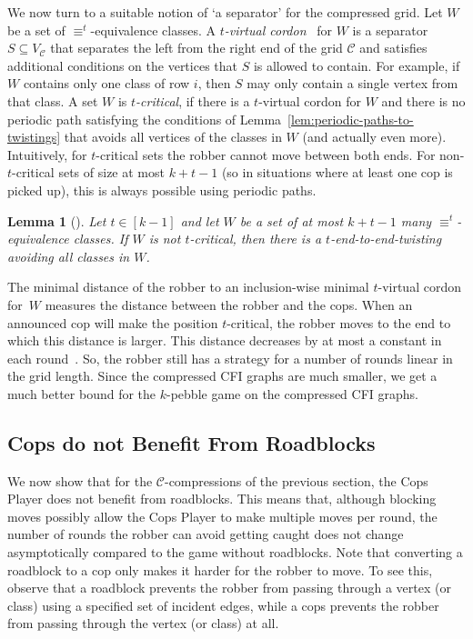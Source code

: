 \documentclass[10pt,a4paper]{article}
\newcommand{\defining}[1]{\emph{#1}}
\newcommand{\comp}{\equiv}
\newcommand{\grid}{\mathcal{C}}
\newcommand{\vertexC}{V_{\mathcal{C}}}
\newtheorem{lemma}[theorem]{Lemma}
\begin{document}
\noindent We now turn to a suitable notion of `a separator' for the compressed grid.
Let $W$ be a set of $\comp^t$-equivalence classes.
A \defining{$t$-virtual cordon}~\cite{RFJN024} for $W$
is a separator $S \subseteq \vertexC$ that separates the left from the right end of the grid $\grid$ and satisfies additional conditions on the vertices that $S$ is allowed to contain. For example, if $W$ contains only one class of row $i$, then $S$ may only contain a single vertex from that class.
A set $W$ is \defining{$t$-critical}, if there is a $t$-virtual cordon for $W$
and there is no periodic path satisfying the conditions of Lemma~\ref{lem:periodic-paths-to-twistings} that avoids all vertices of the classes in $W$ (and actually even more).
Intuitively, for $t$-critical sets the robber cannot move between both ends. For non-$t$-critical sets of size at most $k+t-1$ (so in situations where at least one cop is picked up), this is always possible using periodic paths.
\begin{lemma}[\cite{RFJN024}]
        \label{lem:compressed-non-blocking-strategy}
        Let $t \in [k-1]$ and let $W$ be a set of at most $k+t-1$ many $\comp^t$-equivalence classes. 
        If $W$ is not $t$-critical,
        then there is a $t$-end-to-end-twisting avoiding all classes in $W$.
\end{lemma}
The minimal distance of the robber
to an inclusion-wise minimal $t$-virtual cordon for~$W$ measures the distance between the robber and the cops.
When an announced cop will make the position $t$-critical, the robber moves to the end to which this distance is larger.
This distance decreases by at most a constant in each round~\cite{RFJN024}.
So, the robber still has a strategy for a number of rounds linear in the grid length.
Since the compressed CFI graphs are much smaller,
we get a much better bound for the $k$-pebble game on the compressed CFI graphs. 

\subsection{Cops do not Benefit From Roadblocks}
We now show that for the $\grid$-compressions of the previous section,
the Cops Player does not benefit from roadblocks.
This means that, although blocking moves 
%
 possibly allow the Cops Player to make multiple moves
per round,
the number of rounds the robber can avoid getting caught does not 
change asymptotically compared to the game without roadblocks.
%
%
%
%
%
Note that converting a roadblock to a cop only makes it harder for the robber to move. To see this, observe that a roadblock prevents the robber from passing through a vertex (or class)
using a specified set of incident edges, while
 a cops prevents the robber from passing through the vertex (or class) at all.
\end{document}
